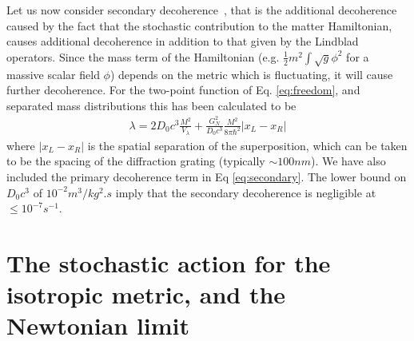 \documentclass[aps,pra,amsmath,amssymb,amsthm,floatfix,nofootinbib,notitlepage,superscriptaddress,10pt]{revtex4-2}
\begin{document}
Let us now consider secondary decoherence~\cite{tilloy2017principle}, that is the additional decoherence caused by the fact that the stochastic contribution to the matter Hamiltonian, causes additional decoherence in addition to that given by the Lindblad operators. Since the mass term of the Hamiltonian (e.g. $\frac{1}{2} m^2 \int \sqrt{g}\phi^2$ for a massive scalar field $\phi$) depends on the metric which is fluctuating, it will cause further decoherence. For the two-point function of Eq. \eqref{eq:freedom}, and separated mass distributions this has been calculated 
to be~\cite{oppenheim2024secondary}
\begin{align}
	\lambda=2D_0 c^3 \frac{M^2}{V_\lambda}+\frac{G_N^2}{D_0 c^3}\frac{M^2}{8\pi \hbar^2}|x_L-x_R|
	\label{eq:secondary}
\end{align}
where $|x_L-x_R|$ is the spatial separation of the superposition, which can be taken to be the spacing of the diffraction grating (typically $\sim 100 nm$). We have also included the primary decoherence term in Eq \eqref{eq:secondary}. The lower bound on $D_0 c^3$ of $10^{-2} \unit{m^3/kg^2.s}$ imply that the secondary decoherence is negligible at $\leq 10^{-7}\unit{s^{-1}}$.  


\section{The stochastic action for the isotropic metric, and the Newtonian limit}
\label{app: isotropic}
\end{document}
